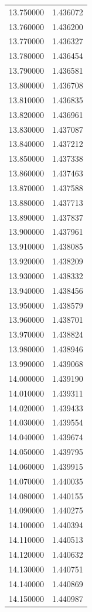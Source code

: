 \begin{tabular}{rr}
13.750000 & 1.436072 \\
13.760000 & 1.436200 \\
13.770000 & 1.436327 \\
13.780000 & 1.436454 \\
13.790000 & 1.436581 \\
13.800000 & 1.436708 \\
13.810000 & 1.436835 \\
13.820000 & 1.436961 \\
13.830000 & 1.437087 \\
13.840000 & 1.437212 \\
13.850000 & 1.437338 \\
13.860000 & 1.437463 \\
13.870000 & 1.437588 \\
13.880000 & 1.437713 \\
13.890000 & 1.437837 \\
13.900000 & 1.437961 \\
13.910000 & 1.438085 \\
13.920000 & 1.438209 \\
13.930000 & 1.438332 \\
13.940000 & 1.438456 \\
13.950000 & 1.438579 \\
13.960000 & 1.438701 \\
13.970000 & 1.438824 \\
13.980000 & 1.438946 \\
13.990000 & 1.439068 \\
14.000000 & 1.439190 \\
14.010000 & 1.439311 \\
14.020000 & 1.439433 \\
14.030000 & 1.439554 \\
14.040000 & 1.439674 \\
14.050000 & 1.439795 \\
14.060000 & 1.439915 \\
14.070000 & 1.440035 \\
14.080000 & 1.440155 \\
14.090000 & 1.440275 \\
14.100000 & 1.440394 \\
14.110000 & 1.440513 \\
14.120000 & 1.440632 \\
14.130000 & 1.440751 \\
14.140000 & 1.440869 \\
14.150000 & 1.440987 \\

\end{tabular}
